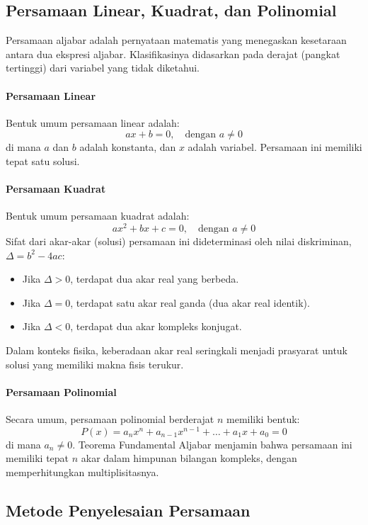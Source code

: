 \documentclass[12pt, a4paper]{article}
\begin{document}
\subsection{Persamaan Linear, Kuadrat, dan Polinomial}
Persamaan aljabar adalah pernyataan matematis yang menegaskan kesetaraan antara dua ekspresi aljabar. Klasifikasinya didasarkan pada derajat (pangkat tertinggi) dari variabel yang tidak diketahui.

\paragraph{Persamaan Linear}
Bentuk umum persamaan linear adalah:
\[
ax + b = 0, \quad \text{dengan } a \neq 0
\]
di mana $a$ dan $b$ adalah konstanta, dan $x$ adalah variabel. Persamaan ini memiliki tepat satu solusi.

\paragraph{Persamaan Kuadrat}
Bentuk umum persamaan kuadrat adalah:
\[
ax^2 + bx + c = 0, \quad \text{dengan } a \neq 0
\]
Sifat dari akar-akar (solusi) persamaan ini dideterminasi oleh nilai diskriminan, $\Delta = b^2 - 4ac$:
\begin{itemize}
    \item Jika $\Delta > 0$, terdapat dua akar real yang berbeda.
    \item Jika $\Delta = 0$, terdapat satu akar real ganda (dua akar real identik).
    \item Jika $\Delta < 0$, terdapat dua akar kompleks konjugat.
\end{itemize}
Dalam konteks fisika, keberadaan akar real seringkali menjadi prasyarat untuk solusi yang memiliki makna fisis terukur.

\paragraph{Persamaan Polinomial}
Secara umum, persamaan polinomial berderajat $n$ memiliki bentuk:
\[
P(x) = a_n x^n + a_{n-1} x^{n-1} + \dots + a_1 x + a_0 = 0
\]
di mana $a_n \neq 0$. Teorema Fundamental Aljabar menjamin bahwa persamaan ini memiliki tepat $n$ akar dalam himpunan bilangan kompleks, dengan memperhitungkan multiplisitasnya.

\subsection{Metode Penyelesaian Persamaan}
\end{document}
